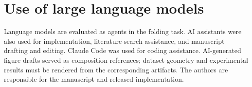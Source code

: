 \section{Use of large language models}
\label{sec:llm-use}

Language models are evaluated as agents in the folding task. AI assistants were also used for
implementation, literature-search assistance, and manuscript drafting and editing. Claude Code
was used for coding assistance. AI-generated figure drafts served as composition references;
dataset geometry and experimental results must be rendered from the corresponding artifacts.
The authors are responsible for the manuscript and released implementation.

